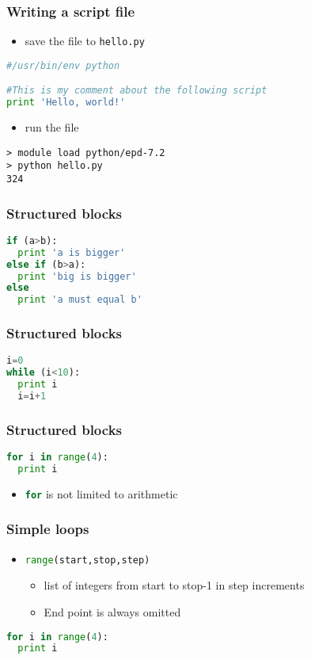\documentclass[xcolor=table,10pt,final]{beamer}
\begin{document}
\begin{frame}[fragile]
  \frametitle{Writing a script file}
  \begin{itemize}
    \item save the file to {\tt hello.py}
  \end{itemize}
\begin{lstlisting}[language=Python]
#/usr/bin/env python

#This is my comment about the following script
print 'Hello, world!'
\end{lstlisting}
\begin{itemize}
  \item run the file
\end{itemize}
\begin{verbatim}
> module load python/epd-7.2
> python hello.py
324
\end{verbatim}
\end{frame}

\begin{frame}[fragile]
  \frametitle{Structured blocks}
  \begin{lstlisting}[language=Python]
if (a>b):
  print 'a is bigger'
else if (b>a):
  print 'big is bigger'
else
  print 'a must equal b'
\end{lstlisting}
\end{frame}

\begin{frame}[fragile]
  \frametitle{Structured blocks}
  \begin{lstlisting}[language=Python]
i=0
while (i<10):
  print i
  i=i+1
\end{lstlisting}
\end{frame}

\begin{frame}[fragile]
  \frametitle{Structured blocks}
  \begin{lstlisting}[language=Python]
for i in range(4):
  print i
\end{lstlisting}
\begin{itemize}
  \item \lstinline[language=Python]|for| is not limited to arithmetic
\end{itemize}
\end{frame}

\begin{frame}[fragile]
  \frametitle{Simple loops}
  \begin{itemize}
    \item \lstinline[language=Python]|range(start,stop,step)|
      \begin{itemize}
        \item list of integers from start to stop-1 in step increments
        \item End point is always omitted
      \end{itemize}
  \end{itemize}
\begin{lstlisting}[language=Python]
for i in range(4):
  print i
\end{lstlisting}
\end{frame}
\end{document}
